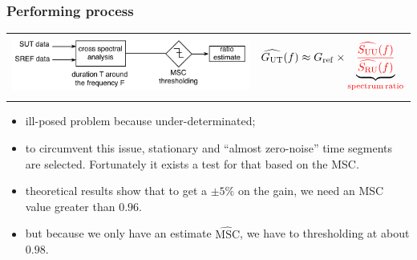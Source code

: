\documentclass[handout,10pt]{beamer}
\def\hMSC{\widehat{\text{MSC}}}
\begin{document}
\begin{frame}
\frametitle{Performing process}

\begin{tabular}{r||l}
\hspace{-1cm}
\begin{minipage}{7cm}
\includegraphics[scale=0.5]{processdetail.pdf}
\end{minipage}
&
\begin{minipage}{3cm}
\begin{eqnarray*}
\widehat{G_{\mathrm{UT}}}(f)
\approx G_{\mathrm{ref}} \times
\underbrace{\color{red}\frac{\widehat{{S}_{\mathrm{UU}}}(f)}
                        {\widehat{{S}_{\mathrm{RU}}}(f)}}
_{\color{red}\mathrm{spectrum}\, \mathrm{ratio}}
\end{eqnarray*}
\end{minipage}
\end{tabular}


\begin{itemize}
\item
ill-posed problem because under-determinated;
\item
to circumvent this issue, stationary and ``almost zero-noise'' time segments are selected. Fortunately it exists a test for that based on the MSC.
\item
theoretical results show that to get a $\pm 5\%$ on the gain, we need an MSC value greater than $0.96$. 
\item
but because we only have  an estimate $\hMSC$, we have to thresholding at about $0.98$. %
\end{itemize}


\end{frame}
\end{document}
